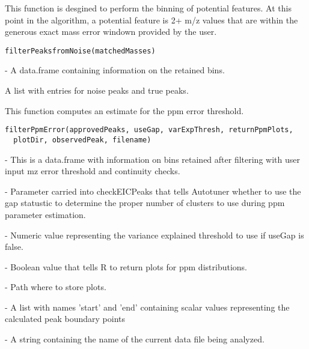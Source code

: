 \documentclass[a4paper]{book}
\begin{document}
%
\begin{Description}\relax
This function is desgined to perform the binning of potential
features. At this point in the algorithm, a potential feature is 2+ m/z
values that are within the generous exact mass error windown provided by
the user.
\end{Description}
%
\begin{Usage}
\begin{verbatim}
filterPeaksfromNoise(matchedMasses)
\end{verbatim}
\end{Usage}
%
\begin{Arguments}
\begin{ldescription}
\item[\code{matchedMasses}] - A data.frame containing information on the
retained bins.
\end{ldescription}
\end{Arguments}
%
\begin{Value}
A list with entries for noise peaks and true peaks.
\end{Value}
%
\begin{Description}\relax
This function computes an estimate for the ppm error threshold.
\end{Description}
%
\begin{Usage}
\begin{verbatim}
filterPpmError(approvedPeaks, useGap, varExpThresh, returnPpmPlots,
  plotDir, observedPeak, filename)
\end{verbatim}
\end{Usage}
%
\begin{Arguments}
\begin{ldescription}
\item[\code{approvedPeaks}] - This is a data.frame with information on bins retained
after filtering with user input mz error threshold and continuity checks.

\item[\code{useGap}] - Parameter carried into checkEICPeaks that tells Autotuner
whether to use the gap statustic to determine the proper number of clusters
to use during ppm parameter estimation.

\item[\code{varExpThresh}] - Numeric value representing the variance explained
threshold to use if useGap is false.

\item[\code{returnPpmPlots}] - Boolean value that tells R to return plots for
ppm distributions.

\item[\code{plotDir}] - Path where to store plots.

\item[\code{observedPeak}] - A list with names 'start' and 'end' containing
scalar values representing the calculated peak boundary points

\item[\code{filename}] - A string containing the name of the current data file being
analyzed.
\end{ldescription}
\end{Arguments}
\end{document}
